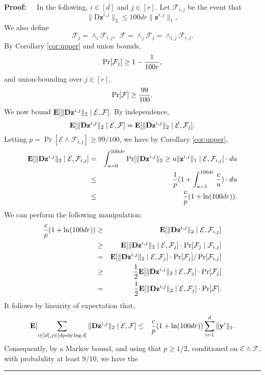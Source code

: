 \documentclass[11pt]{article}
\newenvironment{proof}{\begin{trivlist} \item {\bf Proof:~~}}
  {\qed\end{trivlist}}
\newcommand{\mat}[1]{{\ensuremath{\bm{\mathrm{#1}}}}}
\def\matD{\mat{D}}
\def\frac#1#2{{#1\over #2}}
\def\qed{\hfill\rule{2mm}{2mm}}
\def\y{{\mathbf y}}
\def\z{{\mathbf z}}
\newcommand{\poly}{{\mathrm{poly}}}
\begin{document}
\begin{proof}
In the following, $i \in [d]$ and $j \in [r]$. 
Let $\mathcal{F}_{i,j}$ be the event that 
$$\|\matD \z^{i,j}\|_2 \leq 100 d r \|\z^{i,j}\|_1,$$
We also
define $$\mathcal{F}_j = \wedge_{i} \mathcal{F}_{i,j}, \ \ 
\mathcal{F} = \wedge_{j} \mathcal{F}_j = \wedge_{i, j} \mathcal{F}_{i,j}.$$
By Corollary \ref{cor:upper} and union bounds,
$$\Pr[\mathcal{F}_j] \geq 1 - \frac{1}{100r},$$
and union-bounding over $j \in [r]$, 
$$\Pr[\mathcal{F}] \geq \frac{99}{100}.$$
We now bound ${\bf E}[\|\matD \z^{i,j}\|_2 \mid \mathcal{E}, \mathcal{F}].$
By independence, 
$${\bf E}[\|\matD \z^{i,j}\|_2 \mid \mathcal{E}, \mathcal{F}]
= {\bf E}[\|\matD \z^{i,j}\|_2 \mid \mathcal{E}, \mathcal{F}_j].$$
Letting $p = \Pr[\mathcal{E} \wedge \mathcal{F}_{i,j}] \geq 99/100$, 
we have by Corollary \ref{cor:upper},
\begin{eqnarray*}
{\bf E}[\|\matD \z^{i,j}\|_2 \mid \mathcal{E}, \mathcal{F}_{i,j}]
& = & \int_{u = 0}^{100dr} 
\Pr[\|\matD \z^{i,j}\|_2 \geq u \|\z^{i,j}\|_1 
\mid \mathcal{E}, \mathcal{F}_{i,j}] \cdot du \\
& \leq & \frac{1}{p} (1 + \int_{u = 1}^{100dr} \frac{c}{u}) \cdot du\\
& \leq & \frac{c}{p} (1 + \ln (100dr)).
\end{eqnarray*}
We can perform the following manipulation:
\begin{eqnarray*}
\frac{c}{p}(1 + \ln(100dr)) & \geq & {\bf E}[\|\matD \z^{i,j}\|_2 \mid \mathcal{E}, \mathcal{F}_{i,j}]\\
& \geq & {\bf E}[\|\matD \z^{i,j}\|_2 \mid \mathcal{E}, \mathcal{F}_j] \cdot \Pr[\mathcal{F}_j \mid \mathcal{F}_{i,j}]\\
& = & {\bf E}[\|\matD \z^{i,j}\|_2 \mid \mathcal{E}, \mathcal{F}_j] \cdot \Pr[\mathcal{F}_j]/ \Pr[\mathcal{F}_{i,j}]\\
& \geq & \frac{1}{2} {\bf E}[\|\matD \z^{i,j}\|_2 \mid \mathcal{E}, \mathcal{F}_j] \cdot \Pr[\mathcal{F}_j]\\
& = & \frac{1}{2} {\bf E}[\|\matD \z^{i,j}\|_2 \mid \mathcal{E}, \mathcal{F}_j] \cdot \Pr[\mathcal{F}].
\end{eqnarray*}
It follows by linearity of expectation that,
\begin{eqnarray*}
{\bf E}[\sum_{i \in [d], j \in [d \poly \log d]} \|\matD \z^{i,j}\|_2 \mid \mathcal{E}, \mathcal{F}]
& \leq & \frac{c}{p} (1 + \ln(100dr)) \sum_{i=1}^d \|\y^i\|_1.
\end{eqnarray*}
Consequently, by a Markov bound, and using that $p \geq 1/2$, 
conditioned on $\mathcal{E} \wedge \mathcal{F}$, with probability at least $9/10$, we have the

\end{proof}
\end{document}
